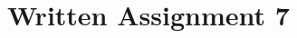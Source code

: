 \documentclass[]{svmono}
\begin{document}
\chapter{Written Assignment 7}

\noindent


%
%



\nocite{*}



%
%
%
%
%
%
%
%
%
%
%
%
%














\end{document}
